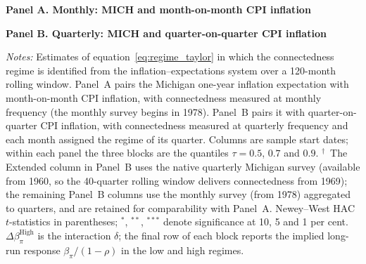 \documentclass{article}
\begin{document}
\begin{table}[!htbp]
\centering
\caption{Expectations connectedness and the policy reaction function: 120-month window}
\label{tab:expconn120}
\begin{threeparttable}
\centering

 

\textbf{Panel A. Monthly: MICH and month-on-month CPI inflation}\par\smallskip
{}

\medskip
\textbf{Panel B. Quarterly: MICH and quarter-on-quarter CPI inflation}\par\smallskip
{}

\begin{tablenotes}\footnotesize
\item \textit{Notes:} Estimates of equation~\eqref{eq:regime_taylor} in which the
connectedness regime is identified from the inflation--expectations system over a 120-month
rolling window. Panel~A pairs the Michigan one-year inflation expectation with month-on-month
CPI inflation, with connectedness measured at monthly frequency (the monthly survey begins
in 1978). Panel~B pairs it with quarter-on-quarter CPI inflation, with connectedness measured
at quarterly frequency and each month assigned the regime of its quarter. Columns are sample
start dates; within each panel the three blocks are the quantiles $\tau=0.5$, $0.7$ and $0.9$.
$^{\dagger}$~The Extended column in Panel~B uses the native quarterly Michigan survey
(available from 1960, so the 40-quarter rolling window delivers connectedness from 1969);
the remaining Panel~B columns use the monthly survey (from 1978) aggregated to quarters,
and are retained for comparability with Panel~A.
Newey--West HAC $t$-statistics in parentheses; $^{*}$, $^{**}$, $^{***}$ denote significance
at 10, 5 and 1 per cent. $\Delta\beta_\pi^{\text{High}}$ is the interaction $\delta$; the
final row of each block reports the implied long-run response $\beta_\pi/(1-\rho)$ in the
low and high regimes.
\end{tablenotes}
\end{threeparttable}
\end{table}

 
\appendix
\end{document}
